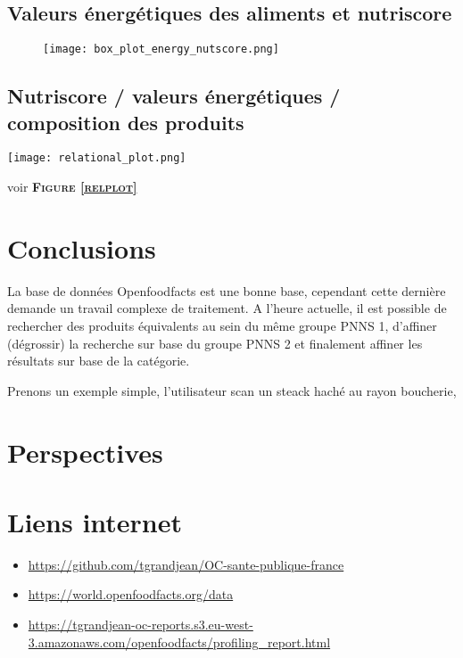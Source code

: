   \subsection{Valeurs énergétiques des aliments et nutriscore}
  \begin{figure}
    \texttt{[image: box\_plot\_energy\_nutscore.png]}
    \caption{}
    \label{}
  \end{figure}

  \subsection{Nutriscore / valeurs énergétiques / composition des produits}


  \begin{figure*}[h]
    \texttt{[image: relational\_plot.png]}
    \caption{}
    \label{relplot}
  \end{figure*}

  voir \textsc{\bf{Figure \ref{relplot}}}
\section{Conclusions}

La base de données Openfoodfacts est une bonne base, cependant cette dernière
demande un travail complexe de traitement. A l'heure actuelle, il est possible
de rechercher des produits équivalents au sein du même groupe PNNS 1, d'affiner
(dégrossir) la recherche sur base du groupe PNNS 2 et finalement affiner les
résultats sur base de la catégorie.

Prenons un exemple simple, l'utilisateur scan un steack haché au rayon boucherie,

\section{Perspectives}


\section{Liens internet}
\label{Liens}
\begin{itemize}
  \item \faGithub \url{https://github.com/tgrandjean/OC-sante-publique-france}
  \item \faDatabase \url{https://world.openfoodfacts.org/data}
  \item \faFileO \url{https://tgrandjean-oc-reports.s3.eu-west-3.amazonaws.com/openfoodfacts/profiling_report.html}
\end{itemize}
